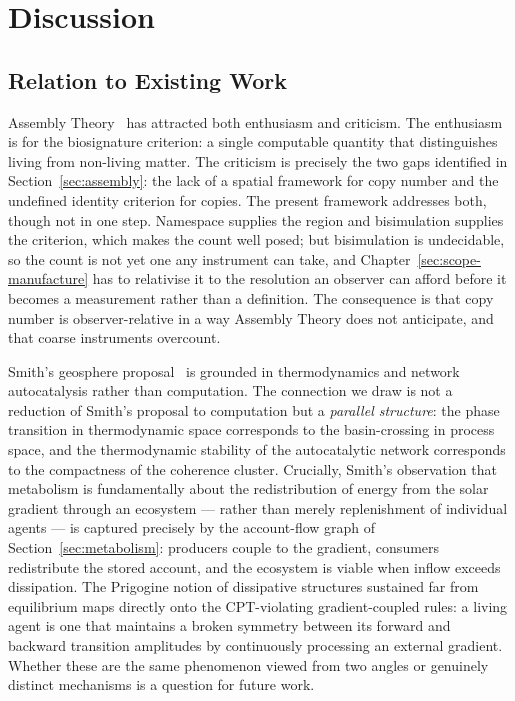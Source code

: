 \chapter{Discussion}
\label{sec:origins-discussion}

\section{Relation to Existing Work}

Assembly Theory~\cite{cronin2023assembly} has attracted both
enthusiasm and criticism.
The enthusiasm is for the biosignature criterion: a single
computable quantity that distinguishes living from non-living matter.
The criticism is precisely the two gaps identified in
Section~\ref{sec:assembly}: the lack of a spatial framework for
copy number and the undefined identity criterion for copies.
The present framework addresses both, though not in one step.
Namespace supplies the region and bisimulation supplies the criterion,
which makes the count well posed; but bisimulation is undecidable, so
the count is not yet one any instrument can take, and
Chapter~\ref{sec:scope-manufacture} has to relativise it to the
resolution an observer can afford before it becomes a measurement rather
than a definition.
The consequence is that copy number is observer-relative in a way
Assembly Theory does not anticipate, and that coarse instruments
overcount.

Smith's geosphere proposal~\cite{smith2016origin} is grounded in
thermodynamics and network autocatalysis rather than computation.
The connection we draw is not a reduction of Smith's proposal to
computation but a \emph{parallel structure}: the phase transition
in thermodynamic space corresponds to the basin-crossing in
process space, and the thermodynamic stability of the autocatalytic
network corresponds to the compactness of the coherence cluster.
Crucially, Smith's observation that metabolism is fundamentally
about the redistribution of energy from the solar gradient through
an ecosystem --- rather than merely replenishment of individual
agents --- is captured precisely by the account-flow graph of
Section~\ref{sec:metabolism}: producers couple to the gradient,
consumers redistribute the stored account, and the ecosystem is
viable when inflow exceeds dissipation.
The Prigogine notion of dissipative structures sustained far from
equilibrium maps directly onto the CPT-violating gradient-coupled
rules: a living agent is one that maintains a broken symmetry
between its forward and backward transition amplitudes by
continuously processing an external gradient.
Whether these are the same phenomenon viewed from two angles or
genuinely distinct mechanisms is a question for future work.


